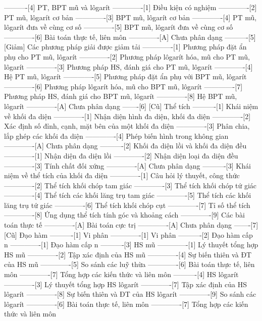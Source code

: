 ----------[4] PT, BPT mũ và lôgarít
-------------[1] Điều kiện có nghiệm
-------------[2] PT mũ, lôgarít cơ bản
-------------[3] BPT mũ, lôgarít cơ bản
-------------[4] PT mũ, lôgarít đưa về cùng cơ số
-------------[5] BPT mũ, lôgarít đưa về cùng cơ số
-------------[6] Bài toán thực tế, liên môn
-------------[A] Chưa phân dạng
----------[5] [Giảm] Các phương pháp giải được giảm tải
-------------[1] Phương pháp đặt ẩn phụ cho PT mũ, lôgarít
-------------[2] Phương pháp lôgarít hóa, mũ cho PT mũ, lôgarít
-------------[3] Phương pháp HS, đánh giá cho PT mũ, lôgarít
-------------[4] Hệ PT mũ, lôgarít
-------------[5] Phương pháp đặt ẩn phụ với BPT mũ, lôgarít
-------------[6] Phương pháp lôgarít hóa, mũ cho BPT mũ, lôgarít
-------------[7] Phương pháp HS, đánh giá cho BPT mũ, lôgarít
-------------[8] Hệ BPT mũ, lôgarít
-------------[A] Chưa phân dạng
-------[6] [Cũ] Thể tích
----------[1] Khái niệm về khối đa diện
-------------[1] Nhận diện hình đa diện, khối đa diện
-------------[2] Xác định số đỉnh, cạnh, mặt bên của một khối đa diện
-------------[3] Phân chia, lắp ghép các khối đa diện
-------------[4] Phép biến hình trong không gian
-------------[A] Chưa phân dạng
----------[2] Khối đa diện lồi và khối đa diện đều
-------------[1] Nhận diện đa diện lồi
-------------[2] Nhận diện loại đa diện đều
-------------[3] Tính chất đối xứng
-------------[A] Chưa phân dạng
----------[3] Khái niệm về thể tích của khối đa diện
-------------[1] Câu hỏi lý thuyết, công thức
-------------[2] Thể tích khối chóp tam giác
-------------[3] Thể tích khối chóp tứ giác
-------------[4] Thể tích các khối lăng trụ tam giác
-------------[5] Thể tích các khối lăng trụ tứ giác
-------------[6] Thể tích khối chóp cụt
-------------[7] Tỉ số thể tích
-------------[8] Ứng dụng thể tích tính góc và khoảng cách
-------------[9] Các bài toán thực tế
-------------[A] Bài toán cực trị
-------------[A] Chưa phân dạng
-------[7] [Cũ] Đạo hàm
----------[1] Vi phân
-------------[1] Vi phân
----------[2] Đạo hàm cấp n
-------------[1] Đạo hàm cấp n
----------[3] HS mũ
-------------[1] Lý thuyết tổng hợp HS mũ
-------------[2] Tập xác định của HS mũ
-------------[4] Sự biến thiên và ĐT của HS mũ
-------------[5] So sánh các luỹ thừa
-------------[6] Bài toán thực tế, liên môn
-------------[7] Tổng hợp các kiến thức và liên môn
----------[4] HS lôgarít
-------------[3] Lý thuyết tổng hợp HS lôgarít
-------------[7] Tập xác định của HS lôgarít
-------------[8] Sự biến thiên và ĐT của HS lôgarít
-------------[9] So sánh các lôgarít
-------------[6] Bài toán thực tế, liên môn
-------------[7] Tổng hợp các kiến thức và liên môn
